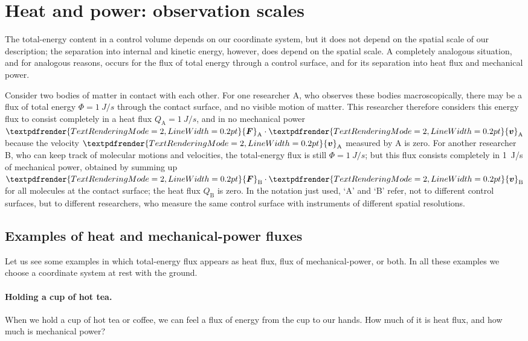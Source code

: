 \documentclass[a4paper,12pt,%
onecolumn,oneside,%
british%
]{memoir}
\renewcommand*{\bm}[1]{\textpdfrender{TextRenderingMode=2,LineWidth=0.2pt}{\boldsymbol{#1}}}
\renewcommand*{\|}[1][]{\nonscript\:#1\vert\nonscript\:\mathopen{}}
\newcommand*{\yv}{\bm{v}}
\newcommand*{\yH}{\varPhi}%
\newcommand*{\yQ}{Q}%
\newcommand*{\yF}{\bm{F}}
\begin{document}
\section{Heat and power: observation scales}
\label{sec:dependence_energyfluxdivision}

The total-energy content in a control volume depends on our coordinate system, but it does not depend on the spatial scale of our description; the separation into internal and kinetic energy, however, does depend on the spatial scale. A completely analogous situation, and for analogous reasons, occurs for the flux of total energy through a control surface, and for its separation into heat flux and mechanical power.

Consider two bodies of matter in contact with each other. For one researcher A, who observes these bodies macroscopically, there may be a flux of total energy $\yH=\qty{1}{J/s}$ through the contact surface, and no visible motion of matter. This researcher therefore considers this energy flux to consist completely in a heat flux $\yQ_{\textrm{A}}=\qty{1}{J/s}$, and in no mechanical power $\yF_{\textrm{A}}\cdot\yv_{\textrm{A}}$ because the velocity $\yv_{\textrm{A}}$ measured by A is zero. For another researcher B, who can keep track of molecular motions and velocities, the total-energy flux is still $\yH=\qty{1}{J/s}$; but this flux consists completely in \qty{1}{J/s} of mechanical power, obtained by summing up $\yF_{\textrm{B}}\cdot\yv_{\textrm{B}}$ for all molecules at the contact surface; the heat flux $\yQ_{\textrm{B}}$ is zero. In the notation just used, \enquote*{A} and \enquote*{B} refer, not to different control surfaces, but to different researchers, who measure the same control surface with instruments of different spatial resolutions.

\subsection{Examples of heat and mechanical-power fluxes}
\label{sec:energy_constitutive_flux_examples}

Let us see some examples in which total-energy flux appears as heat flux, flux of mechanical-power, or both. In all these examples we choose a coordinate system at rest with the ground.

\paragraph{Holding a cup of hot tea.}
When we hold a cup of hot tea or coffee, we can feel a flux of energy from the cup to our hands. How much of it is heat flux, and how much is mechanical power?
\end{document}
